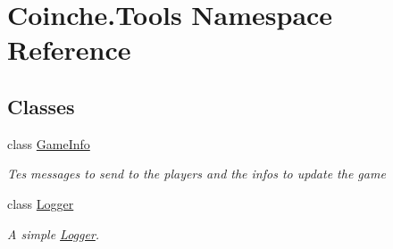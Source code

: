 \hypertarget{namespace_coinche_1_1_tools}{}\section{Coinche.\+Tools Namespace Reference}
\label{namespace_coinche_1_1_tools}
\subsection*{Classes}
\begin{DoxyCompactItemize}
\item 
class \hyperlink{class_coinche_1_1_tools_1_1_game_info}{Game\+Info}
\begin{DoxyCompactList}\small\item\em Tes messages to send to the players and the infos to update the game \end{DoxyCompactList}\item 
class \hyperlink{class_coinche_1_1_tools_1_1_logger}{Logger}
\begin{DoxyCompactList}\small\item\em A simple \hyperlink{class_coinche_1_1_tools_1_1_logger}{Logger}. \end{DoxyCompactList}\end{DoxyCompactItemize}
